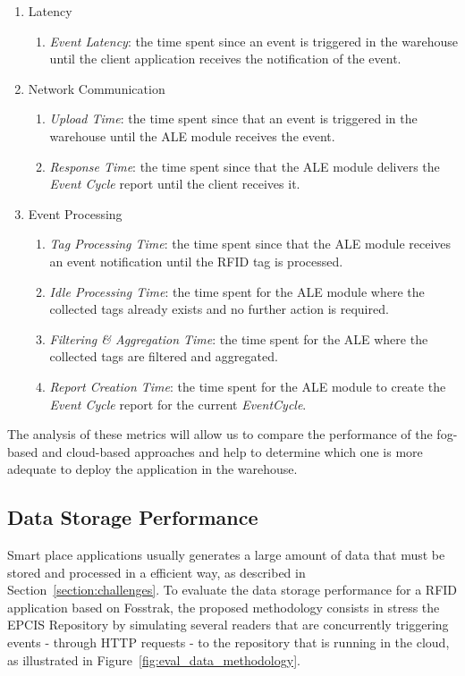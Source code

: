 \begin{enumerate}
  \item Latency
  \begin{enumerate}
    \item \textit{Event Latency}: the time spent since an event is triggered in the warehouse until
    the client application receives the notification of the event.
  \end{enumerate}
  \item Network Communication
  \begin{enumerate}
    \item \textit{Upload Time}: the time spent since that an event is triggered in the warehouse until
    the \gls{ALE} module receives the event.
    \item \textit{Response Time}: the time spent since that the \gls{ALE} module delivers the
    \textit{Event Cycle} report until the client receives it.
  \end{enumerate}
  \item Event Processing
  \begin{enumerate}
    \item \textit{Tag Processing Time}: the time spent since that the \gls{ALE} module receives an event
    notification until the \gls{RFID} tag is processed.
    \item \textit{Idle Processing Time}: the time spent for the \gls{ALE} module where the collected
    tags already exists and no further action is required.
    \item \textit{Filtering \& Aggregation Time}: the time spent for the \gls{ALE} where the
    collected tags are filtered and aggregated.
    \item \textit{Report Creation Time}: the time spent for the \gls{ALE} module to create the
    \textit{Event Cycle} report for the current \textit{EventCycle}.
  \end{enumerate}
\end{enumerate}

The analysis of these metrics will allow us to compare the performance of the fog-based and cloud-based
approaches and help to determine which one is more adequate to deploy the application in the warehouse.

\subsection{Data Storage Performance}
\label{sub:eval_methodology_data}
Smart place applications usually generates a large amount of data that must be stored and processed in
a efficient way, as described in Section~\ref{section:challenges}. To evaluate the data storage
performance for a \gls{RFID} application based on Fosstrak, the proposed methodology consists in
stress the \gls{EPCIS} Repository by simulating several readers that are concurrently triggering events -
through \gls{HTTP} requests - to the repository that is running in the cloud, as illustrated in Figure~\ref{fig:eval_data_methodology}.


